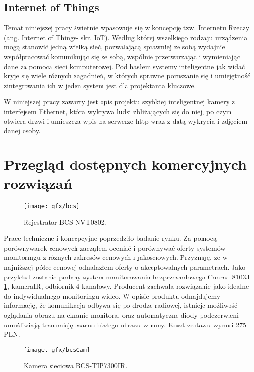 \subsection*{Internet of Things}
Temat niniejszej pracy świetnie wpasowuje się w koncepcję tzw. Internetu Rzeczy (ang. Internet of Things- skr. IoT). Według której wszelkiego rodzaju urządzenia mogą stanowić jedną wielką sieć, pozwalającą sprawniej ze sobą wydajnie współpracować komunikując się ze sobą, wspólnie przetwarzając i wymieniając dane za pomocą sieci komputerowej.
Pod hasłem systemy inteligentne jak widać kryje się wiele różnych zagadnień, w których sprawne poruszanie się i umiejętność zintegrowania ich w jeden system jest dla projektanta kluczowe.

W niniejszej pracy zawarty jest opis projektu szybkiej inteligentnej kamery z interfejsem Ethernet, która wykrywa ludzi zbliżających się do niej, po czym otwiera drzwi i umieszcza wpis na serwerze http wraz z datą wykrycia i zdjęciem danej osoby.

\section{Przegląd dostępnych komercyjnych rozwiązań}

\begin{figure}[bth]
\centering
{\texttt{[image: gfx/bcs]}}
\caption[Rejestrator BCS-NVT0802]{Rejestrator BCS-NVT0802.}
\label{fig:bcs}
\end{figure}

Prace techniczne i koncepcyjne poprzedziło badanie rynku. Za pomocą porównywarek cenowych zacząłem oceniać i porównywać oferty systemów monitoringu z różnych zakresów cenowych i jakościowych. Przyznaję, że w najniższej półce cenowej odnalazłem oferty o akceptowalnych parametrach. Jako przykład zostanie podany system monitorowania bezprzewodowego Conrad 8103J \ref{fig:bcs}, kameraIR, odbiornik 4-kanałowy. Producent zachwala rozwiązanie jako idealne do indywidualnego monitoringu wideo. W opisie produktu odnajdujemy informację, że komunikacja odbywa się po drodze radiowej, istnieje możliwość oglądania obrazu na ekranie monitora, oraz automatyczne diody podczerwieni umożliwiają transmisję czarno-białego obrazu w nocy.  Koszt zestawu wynosi 275 PLN.  

\begin{figure}[bth]
\centering
{\texttt{[image: gfx/bcsCam]}}
\caption[ Kamera sieciowa BCS-TIP7300IR]{ Kamera sieciowa BCS-TIP7300IR.}
\label{fig:Chipscope}
\end{figure}

